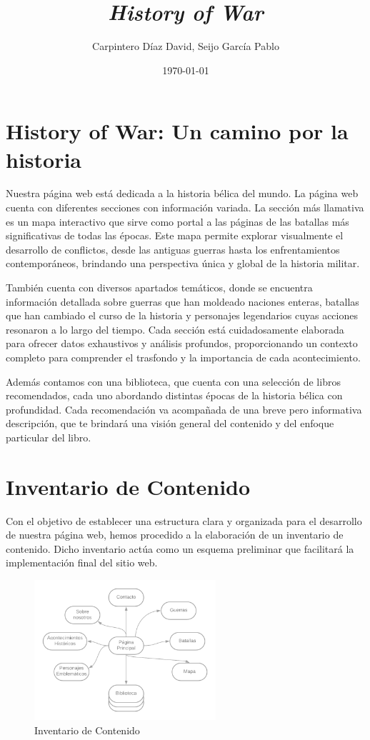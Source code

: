 \documentclass{article}
\title{\textit{History of War}}
\author{Carpintero Díaz David, Seijo García Pablo}
\date{\today}
\begin{document}
\maketitle
\tableofcontents
\newpage

\section{History of War: Un camino por la historia}

Nuestra página web está dedicada a la historia bélica del mundo. La página web cuenta con diferentes secciones con información variada.
La sección más llamativa es un mapa interactivo que sirve como portal a las páginas de las batallas más significativas de todas las épocas. Este mapa permite explorar visualmente el desarrollo de conflictos, desde las antiguas guerras hasta los enfrentamientos contemporáneos, brindando una perspectiva única y global de la historia militar.

También cuenta con diversos apartados temáticos, donde se encuentra información detallada sobre guerras que han moldeado naciones enteras, batallas que han cambiado el curso de la historia y personajes legendarios cuyas acciones resonaron a lo largo del tiempo. Cada sección está cuidadosamente elaborada para ofrecer datos exhaustivos y análisis profundos, proporcionando un contexto completo para comprender el trasfondo y la importancia de cada acontecimiento.

Además contamos con una biblioteca, que cuenta con una selección de libros recomendados, cada uno abordando distintas épocas de la historia bélica con profundidad. Cada recomendación va acompañada de una breve pero informativa descripción, que te brindará una visión general del contenido y del enfoque particular del libro.

\newpage

\section{Inventario de Contenido}

Con el objetivo de establecer una estructura clara y organizada para el desarrollo de nuestra página web, hemos procedido a la elaboración de un inventario de contenido. Dicho inventario actúa como un esquema preliminar que facilitará la implementación final del sitio web.

\begin{figure}[H]
    \centering
    \includegraphics[width=0.6\textwidth]{Esquemas/InventarioContenido.png}
    \caption{Inventario de Contenido}
    \label{fig:mi_imagen}
\end{figure}
\end{document}
